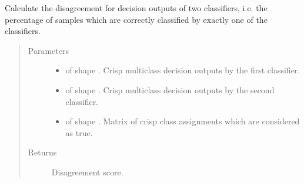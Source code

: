 \documentclass[letterpaper,10pt,english]{sphinxmanual}
\begin{document}
\begin{fulllineitems}
\label{\detokenize{pusion.evaluation.evaluation_metrics:pusion.evaluation.evaluation_metrics.disagreement}}
\sphinxAtStartPar
Calculate the disagreement for decision outputs of two classifiers, i.e. the percentage of samples which are
correctly classified by exactly one of the classifiers.
\begin{quote}\begin{description}
\item[{Parameters}] \leavevmode\begin{itemize}
\item {} 
\sphinxAtStartPar
{} \textendash{}  of shape .
Crisp multiclass decision outputs by the first classifier.

\item {} 
\sphinxAtStartPar
{} \textendash{}  of shape .
Crisp multiclass decision outputs by the second classifier.

\item {} 
\sphinxAtStartPar
{} \textendash{}  of shape .
Matrix of crisp class assignments which are considered as true.

\end{itemize}

\item[{Returns}] \leavevmode
\sphinxAtStartPar
Disagreement score.

\end{description}\end{quote}

\end{fulllineitems}

\end{document}
